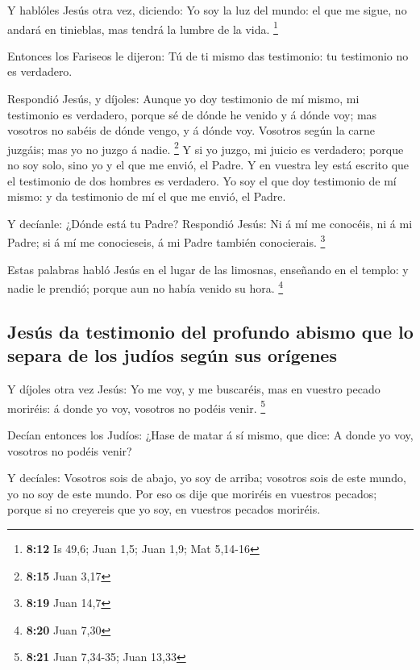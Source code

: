  Y hablóles Jesús otra vez, diciendo: Yo soy la luz del
mundo: el que me sigue, no andará en tinieblas, mas tendrá la lumbre de
la vida. \footnote{\textbf{8:12} Is 49,6; Juan 1,5; Juan 1,9; Mat
  5,14-16}

 Entonces los Fariseos le dijeron: Tú de ti mismo das
testimonio: tu testimonio no es verdadero.

 Respondió Jesús, y díjoles: Aunque yo doy testimonio de
mí mismo, mi testimonio es verdadero, porque sé de dónde he venido y á
dónde voy; mas vosotros no sabéis de dónde vengo, y á dónde voy.
 Vosotros según la carne juzgáis; mas yo no juzgo á
nadie. \footnote{\textbf{8:15} Juan 3,17}  Y si yo juzgo,
mi juicio es verdadero; porque no soy solo, sino yo y el que me envió,
el Padre.  Y en vuestra ley está escrito que el
testimonio de dos hombres es verdadero.  Yo soy el que
doy testimonio de mí mismo: y da testimonio de mí el que me envió, el
Padre.

 Y decíanle: ¿Dónde está tu Padre? Respondió Jesús: Ni á
mí me conocéis, ni á mi Padre; si á mí me conocieseis, á mi Padre
también conocierais. \footnote{\textbf{8:19} Juan 14,7}

 Estas palabras habló Jesús en el lugar de las limosnas,
enseñando en el templo: y nadie le prendió; porque aun no había venido
su hora. \footnote{\textbf{8:20} Juan 7,30}

\hypertarget{jesuxfas-da-testimonio-del-profundo-abismo-que-lo-separa-de-los-juduxedos-seguxfan-sus-oruxedgenes}{%
\subsection{Jesús da testimonio del profundo abismo que lo separa de los
judíos según sus
orígenes}\label{jesuxfas-da-testimonio-del-profundo-abismo-que-lo-separa-de-los-juduxedos-seguxfan-sus-oruxedgenes}}

 Y díjoles otra vez Jesús: Yo me voy, y me buscaréis, mas
en vuestro pecado moriréis: á donde yo voy, vosotros no podéis venir.
\footnote{\textbf{8:21} Juan 7,34-35; Juan 13,33}

 Decían entonces los Judíos: ¿Hase de matar á sí mismo,
que dice: A donde yo voy, vosotros no podéis venir?

 Y decíales: Vosotros sois de abajo, yo soy de arriba;
vosotros sois de este mundo, yo no soy de este mundo. 
Por eso os dije que moriréis en vuestros pecados; porque si no creyereis
que yo soy, en vuestros pecados moriréis.

